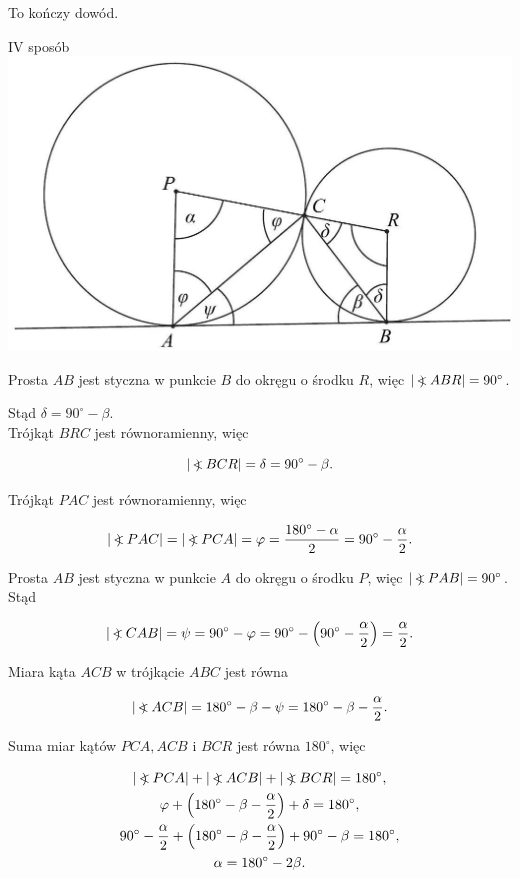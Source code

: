 \documentclass[10pt]{article}
\newcommand\Varangle{\mathop{{<\!\!\!\!\!\text{\small)}}\:}\nolimits}
\begin{document}
To kończy dowód.

IV sposób\\
\includegraphics[max width=\textwidth, center]{2025_02_07_e35f706dbfcfb4be75cfg-10}

Prosta $A B$ jest styczna w punkcie $B$ do okręgu o środku $R$, więc $|\Varangle A B R|=90^{\circ}$.

Stąd $\delta=90^{\circ}-\beta$.\\
Trójkąt $B R C$ jest równoramienny, więc

$$
|\Varangle B C R|=\delta=90^{\circ}-\beta .
$$

Trójkąt $P A C$ jest równoramienny, więc

$$
|\Varangle P A C|=|\Varangle P C A|=\varphi=\frac{180^{\circ}-\alpha}{2}=90^{\circ}-\frac{\alpha}{2} .
$$

Prosta $A B$ jest styczna w punkcie $A$ do okręgu o środku $P$, więc $|\Varangle P A B|=90^{\circ}$. Stąd

$$
|\Varangle C A B|=\psi=90^{\circ}-\varphi=90^{\circ}-\left(90^{\circ}-\frac{\alpha}{2}\right)=\frac{\alpha}{2} .
$$

Miara kąta $A C B$ w trójkącie $A B C$ jest równa

$$
|\Varangle A C B|=180^{\circ}-\beta-\psi=180^{\circ}-\beta-\frac{\alpha}{2} .
$$

Suma miar kątów $P C A, A C B$ i $B C R$ jest równa $180^{\circ}$, więc

$$
\begin{gathered}
|\Varangle P C A|+|\Varangle A C B|+|\Varangle B C R|=180^{\circ}, \\
\varphi+\left(180^{\circ}-\beta-\frac{\alpha}{2}\right)+\delta=180^{\circ}, \\
90^{\circ}-\frac{\alpha}{2}+\left(180^{\circ}-\beta-\frac{\alpha}{2}\right)+90^{\circ}-\beta=180^{\circ}, \\
\alpha=180^{\circ}-2 \beta .
\end{gathered}
$$
\end{document}
